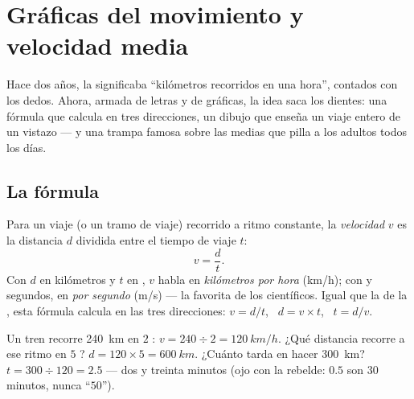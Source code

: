 \chapter{Gráficas del movimiento y velocidad media}\label{ch:g7:motion-average-speed}

Hace dos años, la  significaba ``kilómetros recorridos en una
hora'', contados con los dedos. Ahora, armada de letras y de gráficas,
la idea saca los dientes: una fórmula que calcula en tres direcciones,
un dibujo que enseña un viaje entero de un vistazo --- y una trampa
famosa sobre las medias que pilla a los adultos todos los días.

\section{La fórmula}

\begin{definition}\label{def:g7:motion-average-speed:formula}
Para un viaje (o un tramo de viaje) recorrido a ritmo constante, la
\emph{velocidad} $v$ es la distancia $d$ dividida
entre el tiempo de viaje $t$:
\[
v = \frac{d}{t}.
\]
Con $d$ en kilómetros y $t$ en , $v$ habla en
\emph{kilómetros por hora} (\unit{km/h}); con  y segundos, en
\emph{ por segundo} (\unit{m/s}) --- la favorita de los
científicos. Igual que la de la , esta fórmula calcula en las
tres direcciones: $v = d/t$, \ $d = v \times t$, \ $t = d/v$.
\end{definition}

\begin{example}\label{ex:g7:motion-average-speed:recipes}
Un tren recorre \qty{240}{km} en $2$ : $v = 240 \div 2 =
\qty{120}{km/h}$. ¿Qué distancia recorre a ese ritmo en $5$
? $d = 120 \times 5 = \qty{600}{km}$. ¿Cuánto tarda en hacer
\qty{300}{km}? $t = 300 \div 120 = 2.5$  --- dos  y
treinta minutos (ojo con la rebelde: $0.5$  son $30$ minutos,
nunca ``$50$'').
\end{example}

